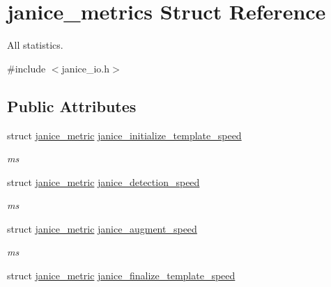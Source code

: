 \hypertarget{structjanice__metrics}{}\section{janice\+\_\+metrics Struct Reference}
\label{structjanice__metrics}


All statistics.  




{\ttfamily \#include $<$janice\+\_\+io.\+h$>$}

\subsection*{Public Attributes}
\begin{DoxyCompactItemize}
\item 
\hypertarget{structjanice__metrics_a32ddd13069a00875f382193cfe08e1a9}{}struct \hyperlink{structjanice__metric}{janice\+\_\+metric} \hyperlink{structjanice__metrics_a32ddd13069a00875f382193cfe08e1a9}{janice\+\_\+initialize\+\_\+template\+\_\+speed}\label{structjanice__metrics_a32ddd13069a00875f382193cfe08e1a9}

\begin{DoxyCompactList}\small\item\em ms \end{DoxyCompactList}\item 
\hypertarget{structjanice__metrics_a021b79ee7372aa254efe254c0818ca9d}{}struct \hyperlink{structjanice__metric}{janice\+\_\+metric} \hyperlink{structjanice__metrics_a021b79ee7372aa254efe254c0818ca9d}{janice\+\_\+detection\+\_\+speed}\label{structjanice__metrics_a021b79ee7372aa254efe254c0818ca9d}

\begin{DoxyCompactList}\small\item\em ms \end{DoxyCompactList}\item 
\hypertarget{structjanice__metrics_a9356b0ce5b178adb6cce74e27f4ddb27}{}struct \hyperlink{structjanice__metric}{janice\+\_\+metric} \hyperlink{structjanice__metrics_a9356b0ce5b178adb6cce74e27f4ddb27}{janice\+\_\+augment\+\_\+speed}\label{structjanice__metrics_a9356b0ce5b178adb6cce74e27f4ddb27}

\begin{DoxyCompactList}\small\item\em ms \end{DoxyCompactList}\item 
\hypertarget{structjanice__metrics_ae809c05639bc0b7467e08668f0e817e9}{}struct \hyperlink{structjanice__metric}{janice\+\_\+metric} \hyperlink{structjanice__metrics_ae809c05639bc0b7467e08668f0e817e9}{janice\+\_\+finalize\+\_\+template\+\_\+speed}\label{structjanice__metrics_ae809c05639bc0b7467e08668f0e817e9}


\end{DoxyCompactItemize}
